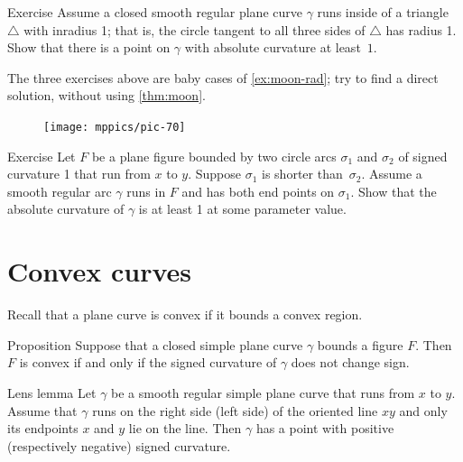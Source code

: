\begin{thm}{Exercise}\label{ex:in-triangle}
Assume a closed smooth regular plane curve $\gamma$ runs inside of a triangle $\triangle$ with inradius 1; that is, the circle tangent to all three sides of $\triangle$ has radius 1. 
Show that there is a point on $\gamma$ with absolute curvature at least~$1$.
\end{thm}

The three exercises above are baby cases of \ref{ex:moon-rad}; try to find a direct solution, without using \ref{thm:moon}.

{

\begin{figure}
\vskip-4mm
\centering
\texttt{[image: mppics/pic-70]}
\vskip0mm
\end{figure}

\begin{thm}{Exercise}\label{ex:lens}
Let $F$ be a plane figure bounded by two circle arcs $\sigma_1$ and $\sigma_2$ of signed curvature 1 that run from $x$ to $y$.
Suppose $\sigma_1$ is shorter than~$\sigma_2$.
Assume a smooth regular arc $\gamma$ runs in $F$ and has both end points on $\sigma_1$.
Show that the absolute curvature of $\gamma$ is at least 1 at some parameter value.

\end{thm}

}

\section{Convex curves}

Recall that a plane curve is convex if it bounds a convex region.

\begin{thm}{Proposition}\label{prop:convex}
Suppose that a closed simple plane curve $\gamma$ bounds a figure $F$.
Then $F$ is convex if and only if the signed curvature of $\gamma$ does not change sign.
\end{thm}


\begin{thm}{Lens lemma}\label{lem:lens}
Let $\gamma$ be a smooth regular simple plane curve that runs from $x$ to $y$.
Assume that $\gamma$ runs on the right side (left side) of the oriented line $xy$ and only its endpoints $x$ and $y$ lie on the line.
Then $\gamma$ has a point with positive (respectively negative) signed curvature.
\end{thm}

